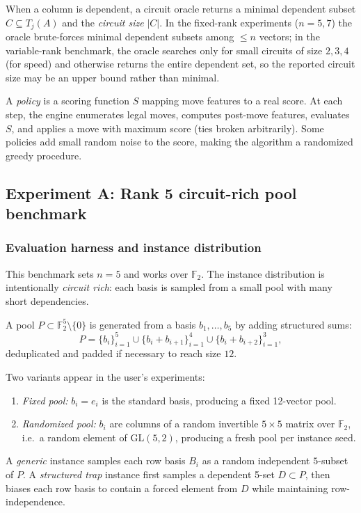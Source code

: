 \documentclass[11pt]{amsart}
\begin{document}
When a column is dependent, a circuit oracle returns a minimal dependent subset $C\subseteq T_j(A)$ and the \emph{circuit size} $|C|$.
In the fixed-rank experiments ($n=5,7$) the oracle brute-forces minimal dependent subsets among $\le n$ vectors; in the variable-rank benchmark, the oracle searches only for small circuits of size $2,3,4$ (for speed) and otherwise returns the entire dependent set, so the reported circuit size may be an upper bound rather than minimal.

A \emph{policy} is a scoring function $S$ mapping move features to a real score.
At each step, the engine enumerates legal moves, computes post-move features, evaluates $S$, and applies a move with maximum score (ties broken arbitrarily).
Some policies add small random noise to the score, making the algorithm a randomized greedy procedure.

\subsection{Experiment A: Rank 5 circuit-rich pool benchmark}
\label{sec:expA}

\subsubsection{Evaluation harness and instance distribution}

This benchmark sets $n=5$ and works over $\mathbb{F}_2$.
The instance distribution is intentionally \emph{circuit rich}: each basis is sampled from a small pool with many short dependencies.

A pool $P\subset \mathbb{F}_2^5\setminus\{0\}$ is generated from a basis $b_1,\dots,b_5$ by adding structured sums:
\[
P=\{b_i\}_{i=1}^5 \cup \{b_i+b_{i+1}\}_{i=1}^4 \cup \{b_i+b_{i+2}\}_{i=1}^3,
\]
deduplicated and padded if necessary to reach size $12$.

Two variants appear in the user's experiments:
\begin{enumerate}
    \item \emph{Fixed pool:} $b_i=e_i$ is the standard basis, producing a fixed 12-vector pool. 
    \item \emph{Randomized pool:} $b_i$ are columns of a random invertible $5\times 5$ matrix over $\mathbb{F}_2$, i.e.\ a random element of $\mathrm{GL}(5,2)$, producing a fresh pool per instance seed.
\end{enumerate}


A \emph{generic} instance samples each row basis $B_i$ as a random independent $5$-subset of $P$.
A \emph{structured trap} instance first samples a dependent 5-set $D\subset P$, then biases each row basis to contain a forced element from $D$ while maintaining row-independence.
\end{document}
